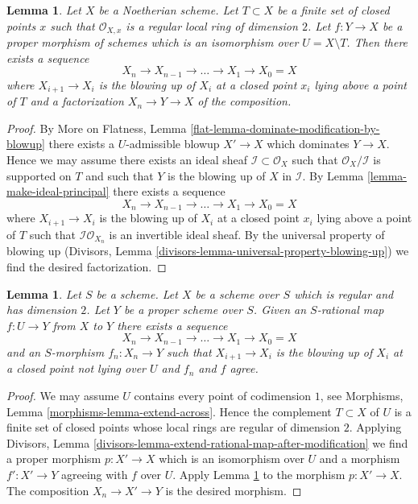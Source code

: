 \documentclass{stacks-project}
\theoremstyle{plain}
\newtheorem{lemma}[subsection]{Lemma}
\theoremstyle{definition}
\theoremstyle{remark}
\numberwithin{equation}{subsection}
\begin{document}
\begin{lemma}
\label{lemma-dominate-by-blowing-up-in-points}
Let $X$ be a Noetherian scheme. Let $T \subset X$ be a finite set of
closed points $x$ such that $\mathcal{O}_{X, x}$ is a regular local
ring of dimension $2$. Let $f : Y \to X$ be a proper morphism of
schemes which is an isomorphism over $U = X \setminus T$.
Then there exists a sequence
$$
X_n \to X_{n - 1} \to \ldots \to X_1 \to X_0 = X
$$
where $X_{i + 1} \to X_i$ is the blowing up of $X_i$ at a closed
point $x_i$ lying above a point of $T$ and a factorization $X_n \to Y \to X$
of the composition.
\end{lemma}

\begin{proof}
By More on Flatness, Lemma \ref{flat-lemma-dominate-modification-by-blowup} 
there exists a $U$-admissible blowup $X' \to X$ which dominates
$Y \to X$. Hence we may assume there exists an ideal sheaf
$\mathcal{I} \subset \mathcal{O}_X$ such that
$\mathcal{O}_X/\mathcal{I}$ is supported on $T$ and such that
$Y$ is the blowing up of $X$ in $\mathcal{I}$.
By Lemma \ref{lemma-make-ideal-principal} 
there exists a sequence
$$
X_n \to X_{n - 1} \to \ldots \to X_1 \to X_0 = X
$$
where $X_{i + 1} \to X_i$ is the blowing up of $X_i$ at a closed
point $x_i$ lying above a point of $T$ such that
$\mathcal{I}\mathcal{O}_{X_n}$ is an invertible ideal sheaf.
By the universal property of blowing up
(Divisors, Lemma
\ref{divisors-lemma-universal-property-blowing-up})
we find the desired factorization.
\end{proof}

\begin{lemma}
\label{lemma-extend-rational-map-blowing-up}
Let $S$ be a scheme. Let $X$ be a scheme over $S$ which is
regular and has dimension $2$. Let $Y$ be a proper
scheme over $S$. Given an $S$-rational map $f : U \to Y$ from
$X$ to $Y$ there exists a sequence
$$
X_n \to X_{n - 1} \to \ldots \to X_1 \to X_0 = X
$$
and an $S$-morphism $f_n : X_n \to Y$ such that $X_{i + 1} \to X_i$
is the blowing up of $X_i$ at a closed point not lying over $U$
and $f_n$ and $f$ agree.
\end{lemma}

\begin{proof}
We may assume $U$ contains every point of codimension $1$, see
Morphisms, Lemma \ref{morphisms-lemma-extend-across}.
Hence the complement $T \subset X$ of $U$ is a finite set
of closed points whose local rings are regular of dimension $2$.
Applying
Divisors, Lemma \ref{divisors-lemma-extend-rational-map-after-modification}
we find a proper morphism $p : X' \to X$ which is an isomorphism
over $U$ and a morphism $f' : X' \to Y$ agreeing with $f$ over $U$.
Apply Lemma \ref{lemma-dominate-by-blowing-up-in-points}
to the morphism $p : X' \to X$. The composition $X_n \to X' \to Y$ is
the desired morphism.
\end{proof}
\end{document}
